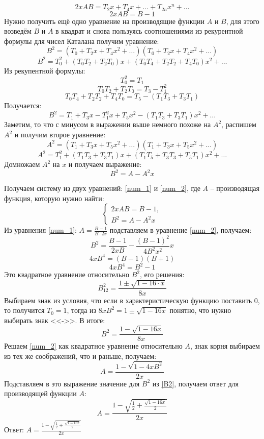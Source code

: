 \documentclass[a4paper,12pt]{article} %
\begin{document}
\[ 2 x A B=T_{2} x+T_{4} x+\ldots+T_{2 n} x^{n}+\ldots\]
\begin{equation}\label{num_1}
2 x A B=B-1
\end{equation} 
Нужно получить ещё одно уравнение на производящие функции $ A $ и $ B $, для этого возведём $ B $ и $ A $ в квадрат и снова пользуясь соотношениями из рекурентной формулы для чисел Каталана получим уравнение:\\
\[B^{2}=\left(T_{0}+T_{2} x+T_{4} x^{2}+\ldots\right)\left(T_{0}+T_{2} x+T_{4} x^{2}+\ldots\right) \]
\[B^{2}=T_{0}^{2}+\left(T_{0} T_{2}+T_{2} T_{0}\right) x+\left(T_{0} T_{4}+T_{2} T_{2}+T_{4} T_{0}\right) x^{2}+\ldots \]
Из рекупентной формулы:
\[T_{0}^{2}=T_{1} \]
\[T_{0} T_{2}+T_{2} T_{0}=T_{3}-T_{1}^{2} \]
\[ T_{0} T_{4}+T_{2} T_{2}+T_{4} T_{0}=T_{5}-\left(T_{1} T_{3}+T_{3} T_{1}\right)\]
Получается:
\[ B^{2}=T_{1}+T_{3} x-T_{1}^{2} x+T_{5} x^{2}-\left(T_{1} T_{3}+T_{3} T_{1}\right) x^{2}+\ldots\]
Заметим, то что с минусом в выражении выше немного похоже на $A^2$, распишем $ A^2 $ и получим второе уравнение:
\[A^{2}=\left(T_{1}+T_{3} x+T_{5} x^{2}+\ldots\right)\left(T_{1}+T_{3} x+T_{5} x^{2}+\ldots\right) \]
\[A^{2}=T_{1}^{2}+\left(T_{1} T_{3}+T_{3} T_{1}\right) x+\left(T_{1} T_{5}+T_{3} T_{3}+T_{5} T_{1}\right) x^{2}+\ldots \]
Домножаем $ A^2 $ на $ x $ и получаем выражение:
\begin{equation}\label{num_2}
B^{2}=A-A^{2} x
\end{equation}

Получаем систему из двух уравнений: \eqref{num_1} и \eqref{num_2}, где $ A $ -- производящая функция, которую нужно найти:
\[
\left\{ 
\begin{aligned}
2 x A B=B-1,\\
B^{2}=A-A^{2} x
\end{aligned}
\right.
\]
Из уравнения \eqref{num_1}: $ A=\frac{B-1}{B \cdot 2 x}$ подставляем в уравнение \eqref{num_2}, получаем:
\[ B^{2}=\frac{B-1}{2 x B}-\frac{(B-1)^{2}}{4 B^{2} x^{2}} x\]
\[ 4 x B^{4}=(B-1)(B+1)\]
\[ 4 x B^{4}=B^{2}-1\]
Это квадратное уравнение относительно $ B^2 $, его решения:
\[ B_{12}^{2}=\frac{1 \pm \sqrt{1-16 \cdot x}}{8 x}\]
Выбираем знак из условия, что если в характеристическую функцию поставить $ 0 $, то получится $ T_0 = 1 $, тогда из 
$ 8 x B^{2}=1 \pm \sqrt{1-16 x} $ понятно, что нужно выбирать знак <<->>. В итоге:
\begin{equation}\label{B2}
B^{2}=\frac{1-\sqrt{1-16 x}}{8 x}
\end{equation}
Решаем \eqref{num_2} как квадратное уравнение относительно $ A $, знак корня выбираем из тех же соображений, что и раньше, получаем:
\[ A=\frac{1-\sqrt{1-4 x B^{2}}}{2 x}\]
Подставляем в это выражение значение для $ B^2 $ из \eqref{B2}, получаем ответ для производящей функции $ A $:
\[ A=\frac{1-\sqrt{\frac{1}{2}+\frac{\sqrt{1-16 x}}{2}}}{2 x}\]
Ответ: $ A=\frac{1-\sqrt{\frac{1}{2}+\frac{\sqrt{1-16 x}}{2}}}{2 x} $
\end{document}
